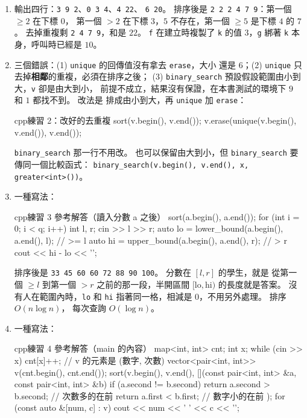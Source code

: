 \begin{enumerate}
\item 輸出四行：\texttt{3 9 2}、\texttt{0 3 4}、\texttt{4 22}、
\texttt{6 20}。 排序後是 \texttt{2 2 2 4 7 9}：第一個 $\ge 2$ 在下標 $0$，
第一個 $> 2$ 在下標 $3$，$5$ 不存在，第一個 $\ge 5$ 是下標 $4$ 的 $7$。
去掉重複剩 \texttt{2 4 7 9}，和是 $22$。 \texttt{f} 在建立時複製了
\texttt{k} 的值 $3$，\texttt{g} 綁著 \texttt{k} 本身，呼叫時已經是 $10$。
\item 三個錯誤：(1) \texttt{unique} 的回傳值沒有拿去 \texttt{erase}，大小
還是 $6$；(2) \texttt{unique} 只去掉\textbf{相鄰}的重複，必須在排序之後；
(3) \texttt{binary\_search} 預設假設範圍由小到大，\texttt{v} 卻是由大到小，
前提不成立，結果沒有保證，在本書測試的環境下 $9$ 和 $1$ 都找不到。 改法是
排成由小到大，再 \texttt{unique} 加 \texttt{erase}：
\begin{code}{cpp}{練習 2：改好的去重複}
sort(v.begin(), v.end());
v.erase(unique(v.begin(), v.end()), v.end());
\end{code}
\texttt{binary\_search} 那一行不用改。 也可以保留由大到小，但
\texttt{binary\_search} 要傳同一個比較函式：
\texttt{binary\_search(v.begin(), v.end(), x, greater<int>())}。
\item 一種寫法：
\begin{code}{cpp}{練習 3 參考解答（讀入分數 a 之後）}
sort(a.begin(), a.end());
for (int i = 0; i < q; i++) {
    int l, r;
    cin >> l >> r;
    auto lo = lower_bound(a.begin(), a.end(), l);  // >= l
    auto hi = upper_bound(a.begin(), a.end(), r);  // > r
    cout << hi - lo << '\n';
}
\end{code}
排序後是 \texttt{33 45 60 60 72 88 90 100}。 分數在 $[l, r]$ 的學生，就是
從第一個 $\ge l$ 到第一個 $> r$ 之前的那一段，半開區間
$[\text{lo}, \text{hi})$ 的長度就是答案。 沒有人在範圍內時，\texttt{lo}
和 \texttt{hi} 指著同一格，相減是 $0$，不用另外處理。 排序 $O(n \log n)$，
每次查詢 $O(\log n)$。
\item 一種寫法：
\begin{code}{cpp}{練習 4 參考解答（main 的內容）}
map<int, int> cnt;
int x;
while (cin >> x) {
    cnt[x]++;
}
// v 的元素是 (數字, 次數)
vector<pair<int, int>> v(cnt.begin(), cnt.end());
sort(v.begin(), v.end(),
     [](const pair<int, int> &a, const pair<int, int> &b) {
         if (a.second != b.second) {
             return a.second > b.second;   // 次數多的在前
         }
         return a.first < b.first;         // 數字小的在前
     });
for (const auto &[num, c] : v) {
    cout << num << ' ' << c << '\n';
}
\end{code}

\end{enumerate}
